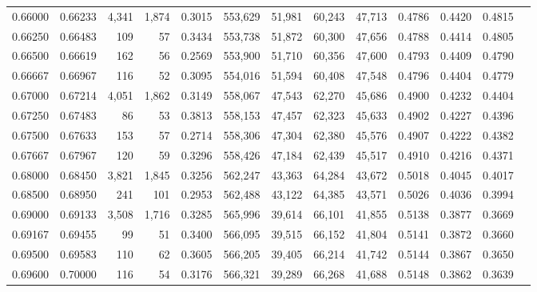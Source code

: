 \begin{tabular}{rrrrrrrrrrrrr}
0.66000 & 0.66233 &  4,341 & 1,874 &                                     0.3015 & 553,629 &  51,981 &  60,243 &  47,713 & 0.4786 & 0.4420 & 0.4815 \\
0.66250 & 0.66483 &    109 &    57 &                                     0.3434 & 553,738 &  51,872 &  60,300 &  47,656 & 0.4788 & 0.4414 & 0.4805 \\
0.66500 & 0.66619 &    162 &    56 &                                     0.2569 & 553,900 &  51,710 &  60,356 &  47,600 & 0.4793 & 0.4409 & 0.4790 \\
0.66667 & 0.66967 &    116 &    52 &                                     0.3095 & 554,016 &  51,594 &  60,408 &  47,548 & 0.4796 & 0.4404 & 0.4779 \\
0.67000 & 0.67214 &  4,051 & 1,862 &                                     0.3149 & 558,067 &  47,543 &  62,270 &  45,686 & 0.4900 & 0.4232 & 0.4404 \\
0.67250 & 0.67483 &     86 &    53 &                                     0.3813 & 558,153 &  47,457 &  62,323 &  45,633 & 0.4902 & 0.4227 & 0.4396 \\
0.67500 & 0.67633 &    153 &    57 &                                     0.2714 & 558,306 &  47,304 &  62,380 &  45,576 & 0.4907 & 0.4222 & 0.4382 \\
0.67667 & 0.67967 &    120 &    59 &                                     0.3296 & 558,426 &  47,184 &  62,439 &  45,517 & 0.4910 & 0.4216 & 0.4371 \\
0.68000 & 0.68450 &  3,821 & 1,845 &                                     0.3256 & 562,247 &  43,363 &  64,284 &  43,672 & 0.5018 & 0.4045 & 0.4017 \\
0.68500 & 0.68950 &    241 &   101 &                                     0.2953 & 562,488 &  43,122 &  64,385 &  43,571 & 0.5026 & 0.4036 & 0.3994 \\
0.69000 & 0.69133 &  3,508 & 1,716 &                                     0.3285 & 565,996 &  39,614 &  66,101 &  41,855 & 0.5138 & 0.3877 & 0.3669 \\
0.69167 & 0.69455 &     99 &    51 &                                     0.3400 & 566,095 &  39,515 &  66,152 &  41,804 & 0.5141 & 0.3872 & 0.3660 \\
0.69500 & 0.69583 &    110 &    62 &                                     0.3605 & 566,205 &  39,405 &  66,214 &  41,742 & 0.5144 & 0.3867 & 0.3650 \\
0.69600 & 0.70000 &    116 &    54 &                                     0.3176 & 566,321 &  39,289 &  66,268 &  41,688 & 0.5148 & 0.3862 & 0.3639 \\

\end{tabular}
